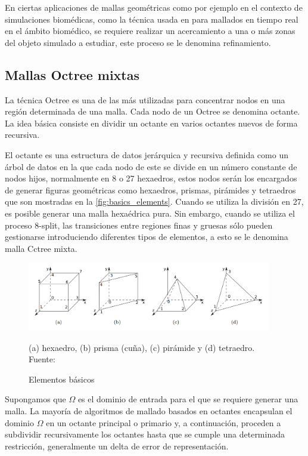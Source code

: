 En ciertas aplicaciones de mallas geométricas como por ejemplo en el contexto de simulaciones biomédicas, como la técnica usada en \cite{lobos2015mixed} para mallados en tiempo real en el ámbito biomédico, se requiere realizar un acercamiento a una o más zonas del objeto simulado a estudiar, este proceso se le denomina refinamiento.

\subsection{Mallas Octree mixtas}

La técnica Octree es una de las más utilizadas para concentrar nodos en una región determinada de una malla. 
Cada nodo de un Octree se denomina octante. La idea básica consiste en dividir un octante en varios octantes nuevos de forma recursiva.

El octante es una estructura de datos jerárquica y recursiva definida como un árbol de datos en la que cada nodo de este se divide en un número constante de nodos hijos, normalmente en 8 o 27 hexaedros, estos nodos serán los encargados de generar figuras geométricas como hexaedros, prismas, pirámides y tetraedros que son mostradas en la \autoref{fig:basics_elements}.
Cuando se utiliza la división en 27, es posible generar una malla hexaédrica pura. Sin embargo, cuando se utiliza el proceso 8-split, las transiciones entre regiones finas y gruesas sólo pueden gestionarse introduciendo diferentes tipos de elementos, a esto se le denomina malla Cctree mixta.

\begin{figure}[h]
    \centering
    \includegraphics[width=0.95\textwidth]{figures/basic-elements.png}
    \caption{\label{fig:basics_elements} Elementos básicos}
     \small{(a) hexaedro, (b) prisma (cuña), (c) pirámide y (d) tetraedro.} \\
    Fuente: \cite{Gonzalez2014}
\end{figure}

Supongamos que $\Omega$ es el dominio de entrada para el que se requiere generar una malla. La mayoría de algoritmos de mallado basados en octantes encapsulan el dominio $\Omega$ en un octante principal o primario y, a continuación, proceden a subdividir recursivamente los octantes hasta que se cumple una determinada restricción, generalmente un delta de error de representación.

